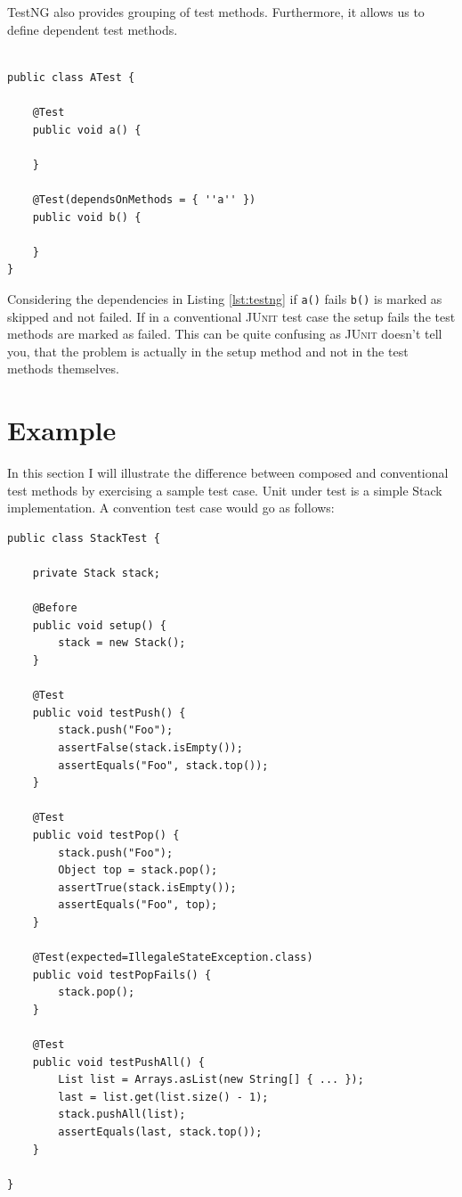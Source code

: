 \documentclass[11pt]{article}
\newcommand{\JUnit}{\textsc{JUnit}\xspace}
\newcommand{\ttt}[1]{\texttt{#1}}
\begin{document}
TestNG also provides grouping of test methods. Furthermore, it allows us to define dependent test methods.

\begin{lstlisting}[label=lst:testng,caption=Dependent test methods in TestNG.]

public class ATest {

	@Test
	public void a() {
		
	}
	
	@Test(dependsOnMethods = { ''a'' })
	public void b() {
	
	}
}

\end{lstlisting}

Considering the dependencies in Listing \ref{lst:testng} if \ttt{a()} fails \ttt{b()} is marked as skipped and not failed. If in a conventional \JUnit test case the setup fails the test methods are marked as failed. This can be quite confusing as \JUnit doesn't tell you, that the problem is actually in the setup method and not in the test methods themselves.

\section{Example}

\lstset{language=Java}

In this section I will illustrate the difference between composed and conventional test methods by exercising a sample test case. Unit under test is a simple Stack implementation. A convention test case would go as follows:

\begin{lstlisting}[label=lst:junit,caption=Conventional \JUnit test case.]
public class StackTest {

    private Stack stack;

    @Before
    public void setup() {
        stack = new Stack();
    }

    @Test
    public void testPush() {
        stack.push("Foo");
        assertFalse(stack.isEmpty());
        assertEquals("Foo", stack.top());
    }

    @Test
    public void testPop() {
        stack.push("Foo");
        Object top = stack.pop();
        assertTrue(stack.isEmpty());
        assertEquals("Foo", top);
    }

    @Test(expected=IllegaleStateException.class)
    public void testPopFails() {
        stack.pop();
    }

    @Test
    public void testPushAll() {
        List list = Arrays.asList(new String[] { ... });
        last = list.get(list.size() - 1);
        stack.pushAll(list);
        assertEquals(last, stack.top());
    }

}
\end{lstlisting}
\end{document}
